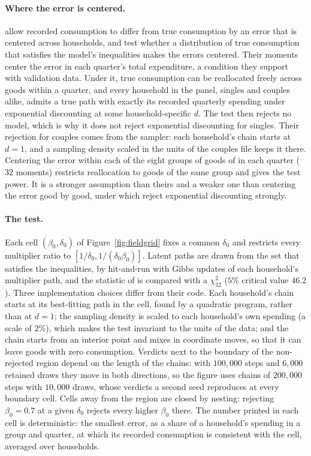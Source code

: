 \documentclass[11pt,a4paper]{article}
\theoremstyle{plain}
\theoremstyle{definition}
\begin{document}
\paragraph{Where the error is centered.} \citet{aguiar2021} allow recorded consumption to differ from true
consumption by an error that is centered across households, and test whether a distribution of true consumption that
satisfies the model's inequalities makes the errors centered. Their moments center the error in each quarter's total
expenditure, a condition they support with validation data. Under it, true consumption can be reallocated freely
across goods within a quarter, and every household in the panel, singles and couples alike, admits a true path with
exactly its recorded quarterly spending under exponential discounting at some household-specific $d$. The test then
rejects no model, which is why it does not reject exponential discounting for singles. Their rejection for couples
comes from the sampler: each household's chain starts at $d=1$, and a sampling density scaled in the units of the
couples file keeps it there. Centering the error within each of the eight groups of goods of \citet{adams2014} in each
quarter ($32$ moments) restricts reallocation to goods of the same group and gives the test power. It is a stronger
assumption than theirs and a weaker one than centering the error good by good, under which \citet[footnote~52]{aguiar2021}
reject exponential discounting strongly.

\paragraph{The test.} Each cell $(\beta_0,\delta_0)$ of Figure~\ref{fig:fieldgrid} fixes a common $\delta_0$ and
restricts every multiplier ratio to $[1/\delta_0,1/(\delta_0\beta_0)]$. Latent paths are drawn from the set that
satisfies the inequalities, by hit-and-run with Gibbs updates of each household's multiplier path, and the statistic
of \citet{aguiar2021} is compared with a $\chi^2_{32}$ ($5\%$ critical value $46.2$). Three implementation choices
differ from their code. Each household's chain starts at its best-fitting path in the cell, found by a quadratic
program, rather than at $d=1$; the sampling density is scaled to each household's own spending (a scale of $2\%$), which
makes the test invariant to the units of the data; and the chain starts from an interior point and
mixes in coordinate moves, so that it can leave goods with zero consumption. Verdicts next to the boundary of the
non-rejected region depend on the length of the chains: with $100{,}000$ steps and $6{,}000$ retained draws they move in
both directions, so the figure uses chains of $200{,}000$ steps with $10{,}000$ draws, whose verdicts a second seed
reproduces at every boundary cell. Cells away from the region are closed by nesting: rejecting $\beta_0=0.7$ at a given
$\delta_0$ rejects every higher $\beta_0$ there. The number printed in each cell is deterministic: the smallest error,
as a share of a household's spending in a group and quarter, at which its recorded consumption is consistent with the
cell, averaged over households.
\end{document}
